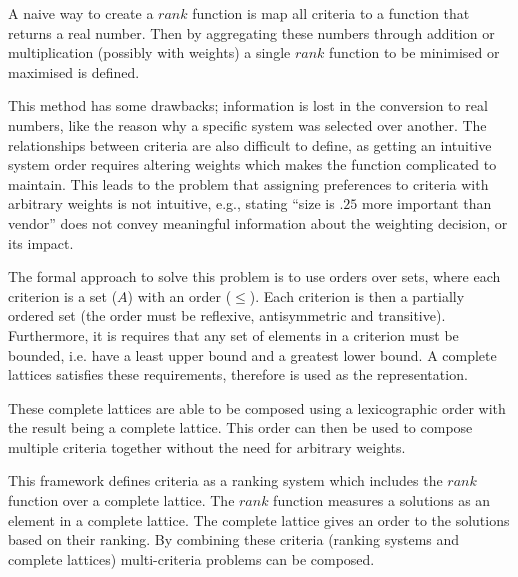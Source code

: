 A naive way to create a $rank$ function is map all criteria to a function that returns a real number.
Then by aggregating these numbers through addition or multiplication (possibly with weights) a single $rank$ function to be minimised or maximised is defined. 

This method has some drawbacks; information is lost in the conversion to real numbers, like the reason why a specific system was selected over another.
The relationships between criteria are also difficult to define, as getting an intuitive system order requires altering weights which makes the function complicated to maintain.
This leads to the problem that assigning preferences to criteria with arbitrary weights is not intuitive,
e.g., stating ``size is $.25$ more important than vendor'' does not convey meaningful information about the weighting decision, or its impact.

The formal approach to solve this problem is to use orders over sets, 
where each criterion is a set ($A$) with an order ($\leq$).
Each criterion is then a partially ordered set (the order must be reflexive, antisymmetric and transitive).
Furthermore, it is requires that any set of elements in a criterion must be bounded, 
i.e. have a least upper bound and a greatest lower bound.
A complete lattices satisfies these requirements, therefore is used as the representation. 

These complete lattices are able to be composed using a lexicographic order with the result being a complete lattice.
This order can then be used to compose multiple criteria together without the need for arbitrary weights.

This framework defines criteria as a ranking system which includes the $rank$ function over a complete lattice.
The $rank$ function measures a solutions as an element in a complete lattice. 
The complete lattice gives an order to the solutions based on their ranking.
By combining these criteria (ranking systems and complete lattices) multi-criteria problems can be composed.

